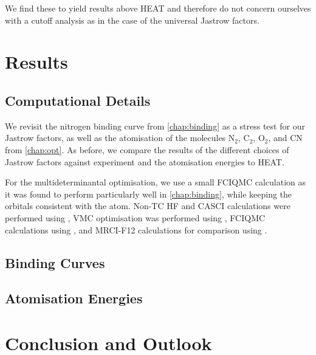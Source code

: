 We find these to yield results above HEAT and therefore do not concern ourselves with a cutoff analysis as in the case of the universal Jastrow factors.

\section{Results}

\subsection{Computational Details}

We revisit the nitrogen binding curve from \autoref{chap:binding} as a stress test for our Jastrow factors, as well as the atomisation of the molecules N$_2$, C$_2$, O$_2$, and CN from \autoref{chap:opt}. As before, we compare the results of the different choices of Jastrow factors against experiment\supercite{leroyAccurate2006} and the atomisation energies to HEAT.\supercite{fellerSurvey2008}

For the multideterminantal optimisation, we use a small FCIQMC calculation as it was found to perform particularly well in \autoref{chap:binding}, while keeping the orbitals consistent with the atom. Non-TC HF and CASCI calculations were performed using \pyscf,\supercite{sunPySCF2018} VMC optimisation was performed using \casino,\supercite{needsVariational2020} FCIQMC calculations using \neci,\supercite{gutherNECI2020} and MRCI-F12 calculations for comparison using \molpro.\supercite{wernerMOLPRO,wernerMolpro2012,wernerMolproQuantumChemistry2020}

\subsection{Binding Curves}

\subsection{Atomisation Energies}


\section{Conclusion and Outlook}

